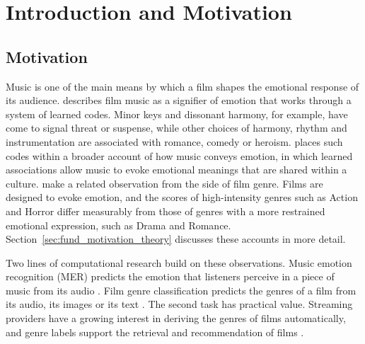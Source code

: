 \chapter{Introduction and Motivation}
\label{ch:introduction}

\section{Motivation}
\label{sec:motivation}

Music is one of the main means by which a film shapes the emotional response of its audience. \citet{gorbman1987unheard} describes film music as a signifier of emotion that works through a system of learned codes. Minor keys and dissonant harmony, for example, have come to signal threat or suspense, while other choices of harmony, rhythm and instrumentation are associated with romance, comedy or heroism. \citet{juslin2013everyday} places such codes within a broader account of how music conveys emotion, in which learned associations allow music to evoke emotional meanings that are shared within a culture. \citet{austin2010characterization} make a related observation from the side of film genre. Films are designed to evoke emotion, and the scores of high-intensity genres such as Action and Horror differ measurably from those of genres with a more restrained emotional expression, such as Drama and Romance. Section~\ref{sec:fund_motivation_theory} discusses these accounts in more detail.

Two lines of computational research build on these observations. Music emotion recognition (MER) predicts the emotion that listeners perceive in a piece of music from its audio \citep{yang2012machine,kim2010music,kang2025there}. Film genre classification predicts the genres of a film from its audio, its images or its text \citep{austin2010characterization,ma2021computational,mangolin2020multimodal,behrouzi2023multimodal}. The second task has practical value. Streaming providers have a growing interest in deriving the genres of films automatically, and genre labels support the retrieval and recommendation of films \citep{mangolin2020multimodal,behrouzi2023multimodal}.

